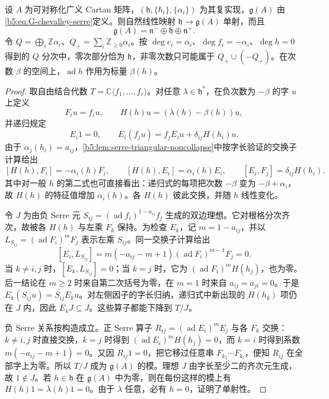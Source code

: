 \begin{theorem}\label{b5:thm:G-triangular-decomposition}
	设 \(A\) 为可对称化广义 Cartan 矩阵，\((\mathfrak h,\{h_i\},\{\alpha_i\})\) 为其复实现，\(\mathfrak g(A)\) 由\eqref{b5:eq:G-chevalley-serre}定义。则自然线性映射 \(\mathfrak h\to\mathfrak g(A)\) 单射，而且
	\[
		\mathfrak g(A)=\mathfrak n^-\oplus\mathfrak h\oplus\mathfrak n^+.
	\]
	令 \(Q=\bigoplus_i\mathbb Z\alpha_i\)、\(Q_+=\sum_i\mathbb Z_{\ge0}\alpha_i\)。按 \(\deg e_i=\alpha_i\)、\(\deg f_i=-\alpha_i\)、\(\deg h=0\) 得到的 \(Q\) 分次中，零次部分恰为 \(\mathfrak h\)，非零次数只可能属于 \(Q_+\cup(-Q_+)\)。在次数 \(\beta\) 的空间上，\(\operatorname{ad}h\) 作用为标量 \(\beta(h)\)。
\end{theorem}
\begin{proof}
	取自由结合代数 \(T=\mathbb C\langle f_1,\ldots,f_r\rangle\)。对任意 \(\lambda\in\mathfrak h^*\)，在负次数为 \(-\beta\) 的字 \(u\) 上定义
	\[
		F_i u=f_i u,\qquad H(h)u=(\lambda(h)-\beta(h))u,
	\]
	并递归规定
	\[
		E_i1=0,\qquad E_i(f_j u)=f_jE_i u+\delta_{ij}H(h_i)u.
	\]
	由于 \(\alpha_j(h_i)=a_{ij}\)，\cref{b5:lem:serre-triangular-noncollapse}中按字长验证的交换子计算给出
	\[
		[H(h),F_i]=-\alpha_i(h)F_i,\qquad
		[H(h),E_i]=\alpha_i(h)E_i,\qquad [E_i,F_j]=\delta_{ij}H(h_i).
	\]
	其中对一般 \(h\) 的第二式也可直接看出：递归式的每项把次数 \(-\beta\) 变为 \(-\beta+\alpha_i\)，故 \(H(h)\) 的特征值增加 \(\alpha_i(h)\)。各 \(H(h)\) 彼此交换，并随 \(h\) 线性变化。

	令 \(J\) 为由负 Serre 元 \(S_{ij}=(\operatorname{ad}f_i)^{1-a_{ij}}f_j\) 生成的双边理想。它对根格分次齐次，故被各 \(H(h)\) 与左乘 \(F_k\) 保持。为检查 \(E_k\)，记 \(m=1-a_{ij}\)，并以 \(L_{S_{ij}}=(\operatorname{ad}F_i)^mF_j\) 表示左乘 \(S_{ij}\)。同一交换子计算给出
	\[
		[E_i,L_{S_{ij}}]
		=m(-a_{ij}-m+1)(\operatorname{ad}F_i)^{m-1}F_j=0.
	\]
	当 \(k\ne i,j\) 时，\([E_k,L_{S_{ij}}]=0\)；当 \(k=j\) 时，它为 \((\operatorname{ad}F_i)^mH(h_j)\)，也为零。后一结论在 \(m\ge2\) 时来自第二次括号为零，在 \(m=1\) 时来自 \(a_{ij}=a_{ji}=0\)。于是 \(E_k(S_{ij}u)=S_{ij}E_ku\)。对左侧因子的字长归纳，递归式中新出现的 \(H(h_k)\) 项仍在 \(J\) 内，因此 \(E_kJ\subseteq J\)。这些算子都能下降到 \(T/J\)。

	负 Serre 关系按构造成立。正 Serre 算子 \(R_{ij}=(\operatorname{ad}E_i)^mE_j\) 与各 \(F_k\) 交换：\(k\ne i,j\) 时直接交换，\(k=j\) 时得到 \((\operatorname{ad}E_i)^mH(h_j)=0\)，而 \(k=i\) 时得到系数 \(m(-a_{ij}-m+1)=0\)。又因 \(R_{ij}1=0\)，把它移过任意串 \(F_{k_1}\cdots F_{k_l}\)，便知 \(R_{ij}\) 在全部字上为零。所以 \(T/J\) 成为 \(\mathfrak g(A)\) 的模。理想 \(J\) 由字长至少二的齐次元生成，故 \(1\notin J\)。若 \(h\in\mathfrak h\) 在 \(\mathfrak g(A)\) 中为零，则在每份这样的模上有 \(H(h)1=\lambda(h)1=0\)。由于 \(\lambda\) 任意，必有 \(h=0\)，证明了单射性。


\end{proof}
